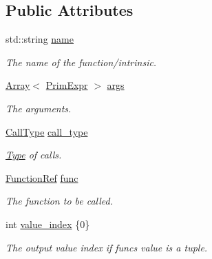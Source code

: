 \subsection*{Public Attributes}
\begin{DoxyCompactItemize}
\item 
std\+::string \hyperlink{classtvm_1_1tir_1_1CallNode_a3bd9e0b7cdea76a46815d6c175f682e0}{name}
\begin{DoxyCompactList}\small\item\em The name of the function/intrinsic. \end{DoxyCompactList}\item 
\hyperlink{classtvm_1_1Array}{Array}$<$ \hyperlink{classtvm_1_1PrimExpr}{Prim\+Expr} $>$ \hyperlink{classtvm_1_1tir_1_1CallNode_a7ca077747fdb2bcb63ca1cac4a49017f}{args}
\begin{DoxyCompactList}\small\item\em The arguments. \end{DoxyCompactList}\item 
\hyperlink{classtvm_1_1tir_1_1CallNode_a13e1f0f48f488fd085ca2684738fa97a}{Call\+Type} \hyperlink{classtvm_1_1tir_1_1CallNode_aa0fadf83d2540a578ffbc6a673a94fb5}{call\+\_\+type}
\begin{DoxyCompactList}\small\item\em \hyperlink{classtvm_1_1Type}{Type} of calls. \end{DoxyCompactList}\item 
\hyperlink{classtvm_1_1tir_1_1FunctionRef}{Function\+Ref} \hyperlink{classtvm_1_1tir_1_1CallNode_afbdbda11e2bc1c47c3bcbaed9a9983e4}{func}
\begin{DoxyCompactList}\small\item\em The function to be called. \end{DoxyCompactList}\item 
int \hyperlink{classtvm_1_1tir_1_1CallNode_a399d6e07f8a5b8a9b15b8596fb548205}{value\+\_\+index} \{0\}
\begin{DoxyCompactList}\small\item\em The output value index if func\textquotesingle{}s value is a tuple. \end{DoxyCompactList}\end{DoxyCompactItemize}
